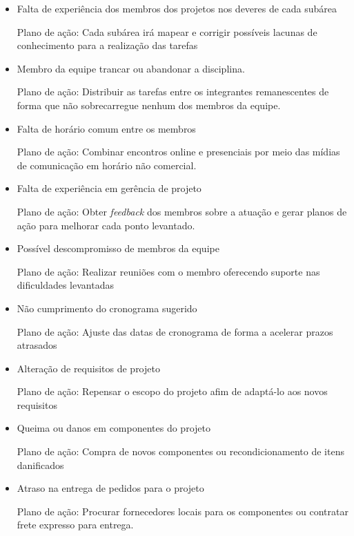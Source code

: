 \begin{itemize}
    \item Falta de experiência dos membros dos projetos nos deveres de cada 
    subárea

Plano de ação: Cada subárea irá mapear e corrigir possíveis lacunas de 
conhecimento para a realização das tarefas

    \item Membro da equipe trancar ou abandonar a disciplina.

Plano de ação: Distribuir as tarefas entre os integrantes remanescentes de 
forma que não sobrecarregue nenhum dos membros da equipe.

    \item Falta de horário comum entre os membros

Plano de ação: Combinar encontros online e presenciais por meio das mídias de 
comunicação em horário não comercial.

    \item Falta de experiência em gerência de projeto

        Plano de ação: Obter  \textit{feedback} dos membros sobre a atuação e gerar planos de 
ação para melhorar cada ponto levantado.

    \item Possível descompromisso de membros da equipe

        Plano de ação: Realizar reuniões com o membro oferecendo suporte nas dificuldades levantadas

    \item Não cumprimento do cronograma sugerido

        Plano de ação: Ajuste das datas de cronograma de forma a acelerar prazos atrasados

    \item Alteração de requisitos de projeto

        Plano de ação: Repensar o escopo do projeto afim de adaptá-lo aos novos requisitos

    \item Queima ou danos em componentes do projeto

        Plano de ação: Compra de novos componentes ou recondicionamento de itens danificados

    \item Atraso na entrega de pedidos para o projeto

        Plano de ação: Procurar fornecedores locais para os componentes ou contratar frete expresso para entrega.
\end{itemize}



